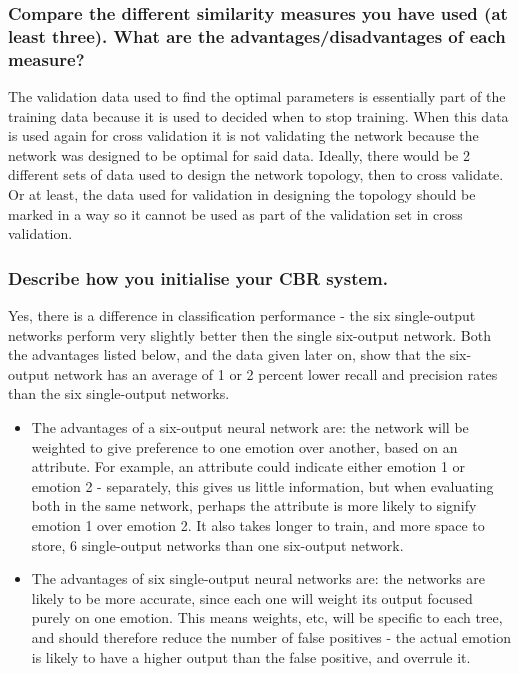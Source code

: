 \documentclass[12pt]{article}
\begin{document}
\subsubsection*{Compare the different similarity measures you have used (at least three). What are the advantages/disadvantages of each measure?}

The validation data used to find the optimal parameters is essentially part of the training data because it is used to decided when to stop training. When this data is used again for cross validation it is not validating the network because the network was designed to be optimal for said data. Ideally, there would be 2 different sets of data used to design the network topology, then to cross validate. Or at least, the data used for validation in designing the topology should be marked in a way so it cannot be used as part of the validation set in cross validation.


\subsubsection*{Describe how you initialise your CBR system.}

Yes, there is a difference in classification performance - the six single-output networks perform very slightly better then the single six-output network. Both the advantages listed below, and the data given later on, show that the six-output network has an average of 1 or 2 percent lower recall and precision rates than the six single-output networks. \\

\begin{itemize}
  \item The advantages of a six-output neural network are: the network will be weighted to give preference to one emotion over another, based on an attribute. For example, an attribute could indicate either emotion 1 or emotion 2 - separately, this gives us little information, but when evaluating both in the same network, perhaps the attribute is more likely to signify emotion 1 over emotion 2. It also takes longer to train, and more space to store,  6 single-output networks than one six-output network.
  \item The advantages of six single-output neural networks are: the networks are likely to be more accurate, since each one will weight its output focused purely on one emotion. This means weights, etc, will be specific to each tree, and should therefore reduce the number of false positives - the actual emotion is likely to have a higher output than the false positive, and overrule it.
\end{itemize}
\end{document}
